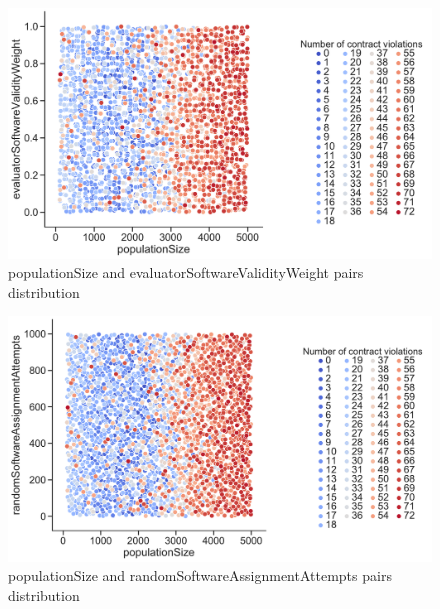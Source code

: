 \begin{figure}
	\centering
	\includegraphics[width=\textwidth]{images/PairsDistr/populationSize_evaluatorSoftwareValidityWeight.pdf}
	\caption[populationSize and evaluatorSoftwareValidityWeight pairs distribution]{populationSize and evaluatorSoftwareValidityWeight pairs distribution}
	\label{fig:populationSize_evaluatorSoftwareValidityWeight_pair}
\end{figure}
\clearpage
\begin{figure}
	\centering
	\includegraphics[width=\textwidth]{images/PairsDistr/populationSize_randomSoftwareAssignmentAttempts.pdf}
	\caption[populationSize and randomSoftwareAssignmentAttempts pairs distribution]{populationSize and randomSoftwareAssignmentAttempts pairs distribution}
	\label{fig:populationSize_randomSoftwareAssignmentAttempts_pair}
\end{figure}
\clearpage
